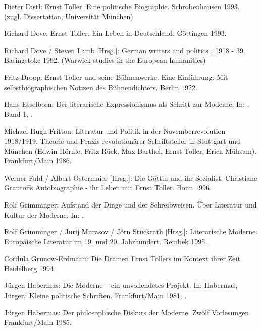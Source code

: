 \begin{BibList}{}
  Dieter Distl:
  Ernst Toller. Eine politische Biographie.
  Schrobenhausen 1993. (zugl. Dissertation,
  Universität München)

  Richard Dove:
  Ernst Toller. Ein Leben in Deutschland. 
  Göttingen 1993.

  Richard Dove /
  Steven Lamb [Hrsg.]:
  German writers and politics : 1918 - 39. 
  Basingstoke 1992.
  (Warwick studies in the European humanities)

  Fritz Droop:
  Ernst Toller und seine Bühnenwerke. Eine Einführung.
  Mit selbstbiographischen Notizen des Bühnendichters. 
  Berlin 1922.

  Hans Esselborn:
  Der literarische Expressionismus als Schritt zur Moderne.
  In: \cite{PIECHO.94}, Band 1, .

  Michael Hugh Fritton:
  Literatur und Politik in der Novemberrevolution 1918/1919.
  Theorie und Praxis revolutionärer Schriftsteller in Stuttgart
  und München (Edwin Hörnle, Fritz Rück, Max Barthel, Ernst Toller, Erich
  Mühsam).
  Frankfurt/Main 1986.

  Werner Fuld /
  Albert Ostermaier [Hrsg.]:
  Die Göttin und ihr Sozialist: Christiane Grautoffs Autobiographie - ihr
  Leben mit Ernst Toller.
  Bonn 1996.

  Rolf Grimminger:
  Aufstand der Dinge und der Schreibweisen. Über Literatur und Kultur der
  Moderne.
  In: .

  Rolf Grimminger /
  Jurij Murasov /
  Jörn Stückrath [Hrsg.]:
  Literarische Moderne. Europäische Literatur im 19. und 20. Jahrhundert.
  Reinbek 1995.

  Cordula Grunow-Erdmann:
  Die Dramen Ernst Tollers im Kontext ihrer Zeit. 
  Heidelberg 1994.

  Jürgen Habermas:
  Die Moderne -- ein unvollendetes Projekt.
  In: Habermas, Jürgen: Kleine politische Schriften. Frankfurt/Main 1981,
  .

  Jürgen Habermas:
  Der philosophische Diskurs der Moderne. Zwölf Vorlesungen. 
  Frankfurt/Main 1985.


\end{BibList}
